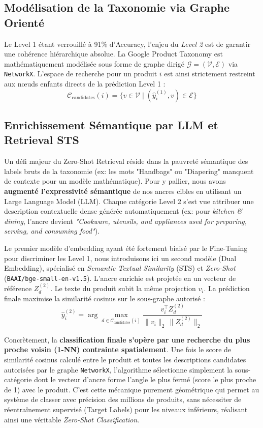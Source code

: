 \documentclass[11pt,a4paper]{article}
\begin{document}
\subsection{Modélisation de la Taxonomie via Graphe Orienté}
Le Level 1 étant verrouillé à 91\% d'Accuracy, l'enjeu du \textit{Level 2} est de garantir une cohérence hiérarchique absolue. La Google Product Taxonomy est mathématiquement modélisée sous forme de graphe dirigé $\mathcal{G} = (\mathcal{V}, \mathcal{E})$ via \texttt{NetworkX}. L'espace de recherche pour un produit $i$ est ainsi strictement restreint aux nœuds enfants directs de la prédiction Level 1 :
\[
\mathcal{C}_{\text{candidates}}(i) = \{ v \in \mathcal{V} \mid (\widehat{y}_i^{(1)}, v) \in \mathcal{E} \}
\]

\subsection{Enrichissement Sémantique par LLM et Retrieval STS}
Un défi majeur du Zero-Shot Retrieval réside dans la pauvreté sémantique des labels bruts de la taxonomie (ex: les mots "Handbags" ou "Diapering" manquent de contexte pour un modèle mathématique). Pour y pallier, nous avons \textbf{augmenté l'expressivité sémantique} de nos ancres cibles en utilisant un Large Language Model (LLM). Chaque catégorie Level 2 s'est vue attribuer une description contextuelle dense générée automatiquement (ex: pour \textit{kitchen \& dining}, l'ancre devient \textit{"Cookware, utensils, and appliances used for preparing, serving, and consuming food"}).

Le premier modèle d'embedding ayant été fortement biaisé par le Fine-Tuning pour discriminer les Level 1, nous introduisons ici un second modèle (Dual Embedding), spécialisé en \textit{Semantic Textual Similarity} (STS) et \textit{Zero-Shot} (\texttt{BAAI/bge-small-en-v1.5}).
L'ancre enrichie est projetée en un vecteur de référence $Z^{(2)}_d$. Le texte du produit subit la même projection $v_i$. La prédiction finale maximise la similarité cosinus sur le sous-graphe autorisé :
\[
\widehat{y}_i^{(2)} = \arg\max_{d \in \mathcal{C}_{\text{candidates}}(i)} \frac{v_i^\top Z^{(2)}_d}{\|v_i\|_2 \, \|Z^{(2)}_d\|_2}
\]

Concrètement, la \textbf{classification finale s'opère par une recherche du plus proche voisin (1-NN) contrainte spatialement}. Une fois le score de similarité cosinus calculé entre le produit et toutes les descriptions candidates autorisées par le graphe \texttt{NetworkX}, l'algorithme sélectionne simplement la sous-catégorie dont le vecteur d'ancre forme l'angle le plus fermé (score le plus proche de 1) avec le produit. C'est cette mécanique purement géométrique qui permet au système de classer avec précision des millions de produits, sans nécessiter de réentraînement supervisé (Target Labels) pour les niveaux inférieurs, réalisant ainsi une véritable \textit{Zero-Shot Classification}.
\end{document}

